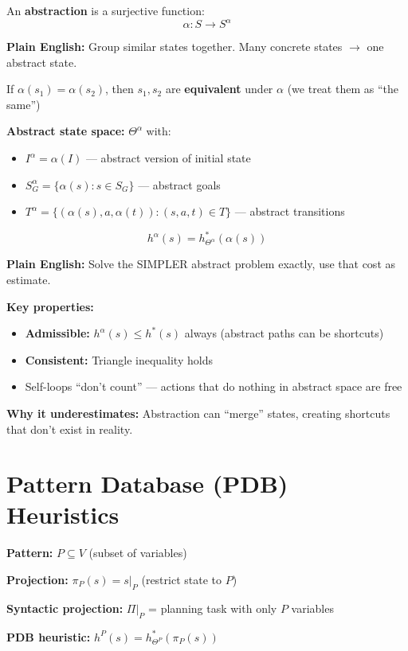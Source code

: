 \documentclass[11pt,a4paper]{article}
\begin{document}
\begin{definitionbox}
An \textbf{abstraction} is a surjective function:
\[\alpha: S \to S^\alpha\]

\textbf{Plain English:} Group similar states together. Many concrete states $\to$ one abstract state.

If $\alpha(s_1) = \alpha(s_2)$, then $s_1, s_2$ are \textbf{equivalent} under $\alpha$ (we treat them as ``the same'')

\textbf{Abstract state space:} $\Theta^\alpha$ with:
\begin{itemize}[leftmargin=*,nosep]
\item $I^\alpha = \alpha(I)$ --- abstract version of initial state
\item $S_G^\alpha = \{\alpha(s) : s \in S_G\}$ --- abstract goals
\item $T^\alpha = \{(\alpha(s), a, \alpha(t)) : (s,a,t) \in T\}$ --- abstract transitions
\end{itemize}
\end{definitionbox}

\begin{definitionbox}
\[h^\alpha(s) = h^*_{\Theta^\alpha}(\alpha(s))\]

\textbf{Plain English:} Solve the SIMPLER abstract problem exactly, use that cost as estimate.

\textbf{Key properties:}
\begin{itemize}[leftmargin=*,nosep]
\item \textbf{Admissible:} $h^\alpha(s) \leq h^*(s)$ always (abstract paths can be shortcuts)
\item \textbf{Consistent:} Triangle inequality holds
\item Self-loops ``don't count'' --- actions that do nothing in abstract space are free
\end{itemize}

\textbf{Why it underestimates:} Abstraction can ``merge'' states, creating shortcuts that don't exist in reality.
\end{definitionbox}

\section{Pattern Database (PDB) Heuristics}

\begin{definitionbox}
\textbf{Pattern:} $P \subseteq V$ (subset of variables)

\textbf{Projection:} $\pi_P(s) = s|_P$ (restrict state to $P$)

\textbf{Syntactic projection:} $\Pi|_P$ = planning task with only $P$ variables

\textbf{PDB heuristic:} $h^P(s) = h^*_{\Theta^P}(\pi_P(s))$
\end{definitionbox}
\end{document}
